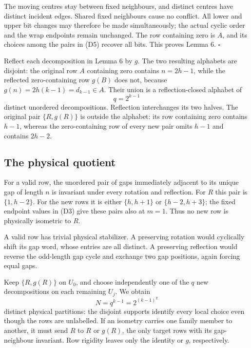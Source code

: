 \documentclass[11pt,a4paper]{article}
\begin{document}
The moving centres stay between fixed neighbours, and distinct centres have distinct incident edges. Shared fixed neighbours cause no conflict. All lower and upper bit changes may therefore be made simultaneously; the actual cyclic order and the wrap endpoints remain unchanged. The row containing zero is \(A\), and its choices among the pairs in (D5) recover all bits. This proves Lemma 6. \(\square\)

Reflect each decomposition in Lemma 6 by \(g\). The two resulting alphabets are disjoint: the original row \(A\) containing zero contains \(n=2h-1\), while the reflected zero-containing row \(g(B)\) does not, because \(g(n)=2h(k-1)=d_{k-1}\in A\). Their union is a reflection-closed alphabet of \begin{equation}
q=2^{k-1}
\tag{D12}\label{eq:D12}
\end{equation} distinct unordered decompositions. Reflection interchanges its two halves. The original pair \(\{R,g(R)\}\) is outside the alphabet: its row containing zero contains \(h-1\), whereas the zero-containing row of every new pair omits \(h-1\) and contains \(2h-2\).

\hypertarget{the-physical-quotient}{%
\subsection{The physical quotient}\label{the-physical-quotient}}

For a valid row, the unordered pair of gaps immediately adjacent to its unique gap of length \(n\) is invariant under every rotation and reflection. For \(R\) this pair is \(\{1,h-2\}\). For the new rows it is either \(\{h,h+1\}\) or \(\{h-2,h+3\}\); the fixed endpoint values in (D3) give these pairs also at \(m=1\). Thus no new row is physically isometric to \(R\).

A valid row has trivial physical stabilizer. A preserving rotation would cyclically shift its gap word, whose entries are all distinct. A preserving reflection would reverse the odd-length gap cycle and exchange two gap positions, again forcing equal gaps.

Keep \(\{R,g(R)\}\) on \(U_0\), and choose independently one of the \(q\) new decompositions on each remaining \(U_j\). We obtain \[
 N=q^{k-1}=2^{(k-1)^2}
\] distinct physical partitions: the disjoint supports identify every local choice even though the rows are unlabelled. If an isometry carries one family member to another, it must send \(R\) to \(R\) or \(g(R)\), the only target rows with its gap-neighbour invariant. Row rigidity leaves only the identity or \(g\), respectively.
\end{document}
